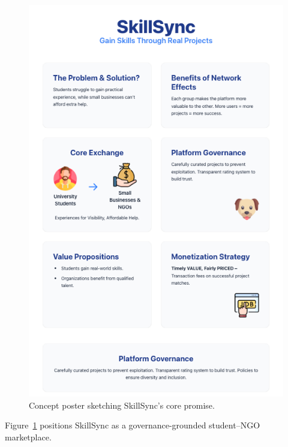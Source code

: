 \documentclass[12pt,a4paper]{article}
\begin{document}
\begin{figure}[H]
  \centering
  \includegraphics[width=0.7\linewidth]{figures/Poster.png}
  \caption{Concept poster sketching SkillSync's core promise.}
  \label{fig:intro-showcase}
\end{figure}

Figure~\ref{fig:intro-showcase} positions SkillSync as a governance-grounded student--NGO marketplace.












\newpage


\end{document}

